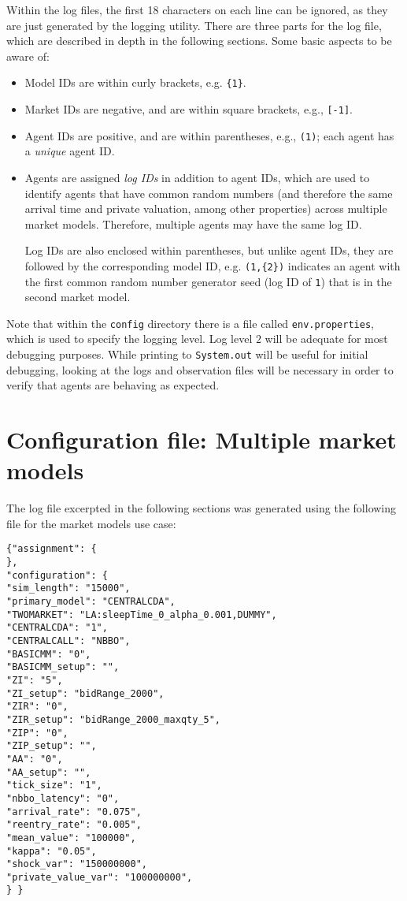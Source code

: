 \documentclass[11pt]{article}
\begin{document}
Within the log files, the first 18 characters on each line can be ignored, as they are just generated by the logging utility.
%
There are three parts for the log file, which are described in depth in the following sections. Some basic aspects to be aware of:

\begin{itemize}
\item Model IDs are within curly brackets, e.g. \verb|{1}|.

\item Market IDs are negative, and are within square brackets, e.g., \verb|[-1]|.

\item Agent IDs are positive, and are within parentheses, e.g., \verb|(1)|; each agent has a \emph{unique} agent ID.

\item Agents are assigned \emph{log IDs} in addition to agent IDs, which are used to identify agents that have common random numbers (and therefore the same arrival time and private valuation, among other properties) across multiple market models. Therefore, multiple agents may have the same log ID.

Log IDs are also enclosed within parentheses, but unlike agent IDs, they are followed by the corresponding model ID, e.g. \verb|(1,{2})| indicates an agent with the first common random number generator seed (log ID of \verb|1|) that is in the second market model.
\end{itemize}

Note that within the \verb|config| directory there is a file called \verb|env.properties|, which is used to specify the logging level. Log level $2$ will be adequate for most debugging purposes.
%
While printing to \verb|System.out| will be useful for initial debugging, looking at the logs and observation files will be necessary in order to verify that agents are behaving as expected.

\section{Configuration file: Multiple market models}

The log file excerpted in the following sections was generated using the following  file for the market models use case:
\begin{verbatim}
{"assignment": {
},
"configuration": {
"sim_length": "15000",
"primary_model": "CENTRALCDA",
"TWOMARKET": "LA:sleepTime_0_alpha_0.001,DUMMY",
"CENTRALCDA": "1",
"CENTRALCALL": "NBBO",
"BASICMM": "0",
"BASICMM_setup": "",
"ZI": "5",
"ZI_setup": "bidRange_2000",
"ZIR": "0",
"ZIR_setup": "bidRange_2000_maxqty_5",
"ZIP": "0",
"ZIP_setup": "",
"AA": "0",
"AA_setup": "",
"tick_size": "1",
"nbbo_latency": "0",
"arrival_rate": "0.075",
"reentry_rate": "0.005",
"mean_value": "100000",
"kappa": "0.05",
"shock_var": "150000000",
"private_value_var": "100000000",
} }
\end{verbatim}
\end{document}
